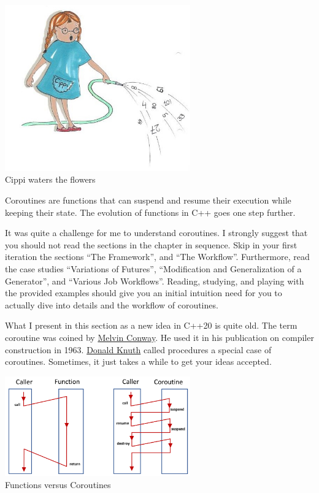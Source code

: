 \begin{center}
\includegraphics[width=0.6\textwidth]{content/3/chapter6/images/2.png}\\
Cippi waters the flowers
\end{center}

Coroutines are functions that can suspend and resume their execution while keeping their state. The evolution of functions in C++ goes one step further.

\begin{tcolorbox}[colback=red!5!white,colframe=red!75!black,title={The Challenge of Understanding Coroutines}]
	
It was quite a challenge for me to understand coroutines. I strongly suggest that you should not read the sections in the chapter in sequence. Skip in your first iteration the sections “The Framework”, and “The Workflow”. Furthermore, read the case studies “Variations of Futures”, “Modification and Generalization of a Generator”, and “Various Job Workflows”. Reading, studying, and playing with the provided examples should give you an initial intuition need for you to actually dive into details and the workflow of coroutines.
	
\end{tcolorbox}

What I present in this section as a new idea in C++20 is quite old. The term coroutine was coined by \href{https://en.wikipedia.org/wiki/Melvin_Conway}{Melvin Conway}. He used it in his publication on compiler construction in 1963. \href{https://en.wikipedia.org/wiki/Donald_Knuth}{Donald Knuth} called procedures a special case of coroutines. Sometimes, it just takes a while to get your ideas accepted.

\begin{center}
\includegraphics[width=0.6\textwidth]{content/3/chapter6/images/3.png}\\
Functions versus Coroutines
\end{center}


